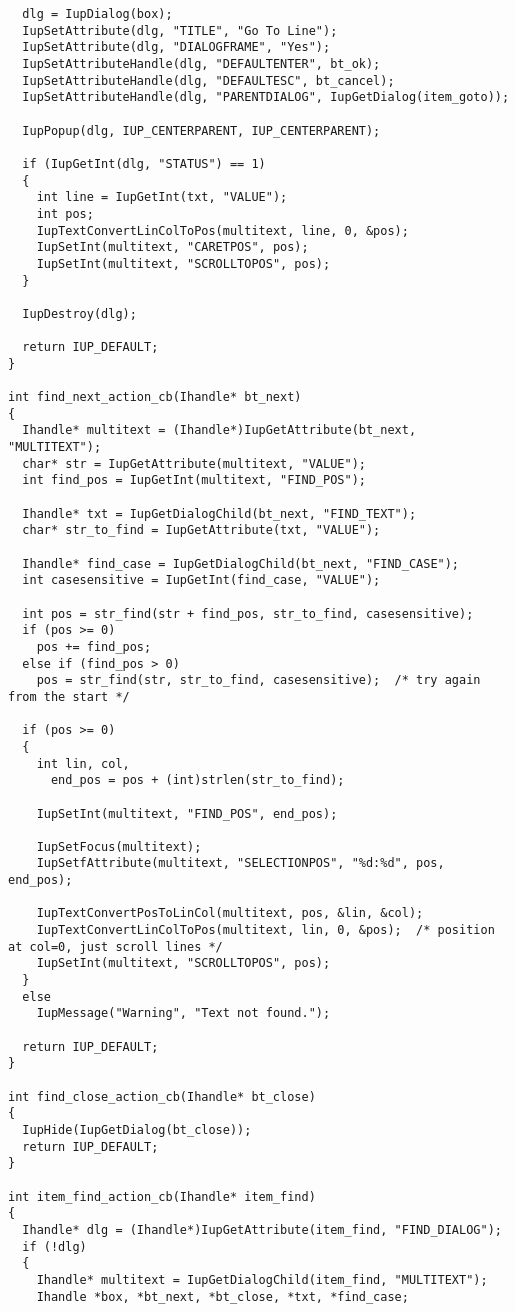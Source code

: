 \documentclass{ctexart}
\begin{document}
\begin{lstlisting}
  dlg = IupDialog(box);
  IupSetAttribute(dlg, "TITLE", "Go To Line");
  IupSetAttribute(dlg, "DIALOGFRAME", "Yes");
  IupSetAttributeHandle(dlg, "DEFAULTENTER", bt_ok);
  IupSetAttributeHandle(dlg, "DEFAULTESC", bt_cancel);
  IupSetAttributeHandle(dlg, "PARENTDIALOG", IupGetDialog(item_goto));

  IupPopup(dlg, IUP_CENTERPARENT, IUP_CENTERPARENT);

  if (IupGetInt(dlg, "STATUS") == 1)
  {
    int line = IupGetInt(txt, "VALUE");
    int pos;
    IupTextConvertLinColToPos(multitext, line, 0, &pos);
    IupSetInt(multitext, "CARETPOS", pos);
    IupSetInt(multitext, "SCROLLTOPOS", pos);
  }

  IupDestroy(dlg);

  return IUP_DEFAULT;
}

int find_next_action_cb(Ihandle* bt_next)
{
  Ihandle* multitext = (Ihandle*)IupGetAttribute(bt_next, "MULTITEXT");
  char* str = IupGetAttribute(multitext, "VALUE");
  int find_pos = IupGetInt(multitext, "FIND_POS");

  Ihandle* txt = IupGetDialogChild(bt_next, "FIND_TEXT");
  char* str_to_find = IupGetAttribute(txt, "VALUE");

  Ihandle* find_case = IupGetDialogChild(bt_next, "FIND_CASE");
  int casesensitive = IupGetInt(find_case, "VALUE");

  int pos = str_find(str + find_pos, str_to_find, casesensitive);
  if (pos >= 0)
    pos += find_pos;
  else if (find_pos > 0)
    pos = str_find(str, str_to_find, casesensitive);  /* try again from the start */

  if (pos >= 0)
  {
    int lin, col, 
      end_pos = pos + (int)strlen(str_to_find);

    IupSetInt(multitext, "FIND_POS", end_pos);

    IupSetFocus(multitext);
    IupSetfAttribute(multitext, "SELECTIONPOS", "%d:%d", pos, end_pos);

    IupTextConvertPosToLinCol(multitext, pos, &lin, &col);
    IupTextConvertLinColToPos(multitext, lin, 0, &pos);  /* position at col=0, just scroll lines */
    IupSetInt(multitext, "SCROLLTOPOS", pos);
  }
  else
    IupMessage("Warning", "Text not found.");

  return IUP_DEFAULT;
}

int find_close_action_cb(Ihandle* bt_close)
{
  IupHide(IupGetDialog(bt_close));
  return IUP_DEFAULT;
}

int item_find_action_cb(Ihandle* item_find)
{
  Ihandle* dlg = (Ihandle*)IupGetAttribute(item_find, "FIND_DIALOG");
  if (!dlg)
  {
    Ihandle* multitext = IupGetDialogChild(item_find, "MULTITEXT");
    Ihandle *box, *bt_next, *bt_close, *txt, *find_case;


\end{lstlisting}
\end{document}
